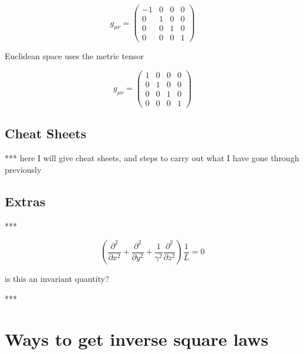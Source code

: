 \begin{equation}
	g_{\mu\nu} = \begin{pmatrix}
		-1 & 0 & 0 & 0 \\
		0  & 1 & 0 & 0 \\
		0  & 0 & 1 & 0 \\
		0  & 0 & 0 & 1
	\end{pmatrix}
\end{equation}

Euclidean space uses the metric tensor

\begin{equation}
	g_{\mu\nu} = \begin{pmatrix}
		1 & 0 & 0 & 0 \\
		0 & 1 & 0 & 0 \\
		0 & 0 & 1 & 0 \\
		0 & 0 & 0 & 1
	\end{pmatrix}
\end{equation}


\section{Cheat Sheets}\label{sect: Cheat Sheets}

*** here I will give cheat sheets, and steps to carry out what I have gone through previously

\section{Extras}\label{sect: Extras}

***

\begin{equation}
	\left( \frac{\partial^2}{\partial x^2} + \frac{\partial^2}{\partial y^2} + \frac{1}{\gamma^2} \frac{\partial^2}{\partial z^2} \right) \frac{1}{L} = 0
\end{equation}

is this an invariant quantity?

***

\chapter{Ways to get inverse square laws}\label{ch: Ways to get inverse square laws}

